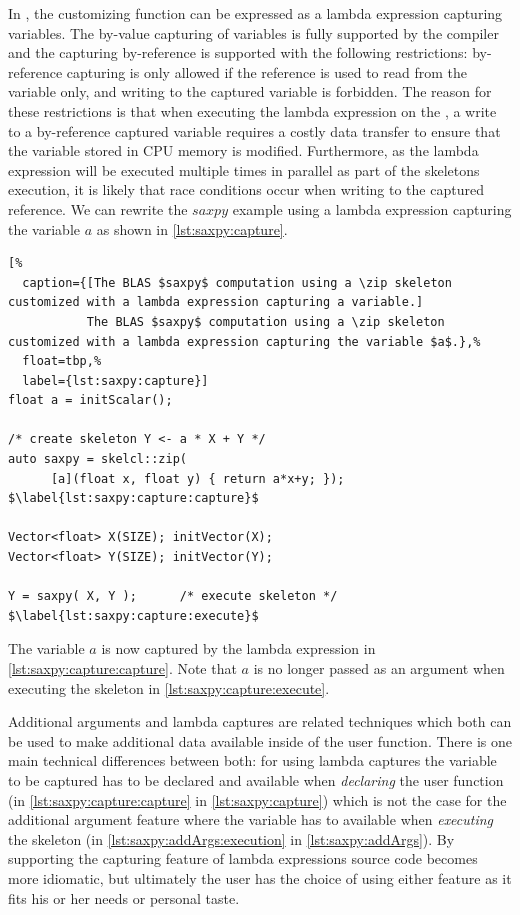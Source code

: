 In \SkelCL, the customizing function can be expressed as a lambda expression capturing variables.
The by-value capturing of variables is fully supported by the  compiler and the capturing by-reference is supported with the following restrictions:
by-reference capturing is only allowed if the reference is used to read from the variable only, and writing to the captured variable is forbidden.
The reason for these restrictions is that when executing the lambda expression on the \GPU, a write to a by-reference captured variable requires a costly data transfer to ensure that the variable stored in CPU memory is modified.
Furthermore, as the lambda expression will be executed multiple times in parallel as part of the skeletons execution, it is likely that race conditions occur when writing to the captured reference.
We can rewrite the $saxpy$ example using a lambda expression capturing the variable $a$ as shown in \autoref{lst:saxpy:capture}.
\begin{lstlisting}[%
  caption={[The BLAS $saxpy$ computation using a \zip skeleton customized with a lambda expression capturing a variable.]
           The BLAS $saxpy$ computation using a \zip skeleton customized with a lambda expression capturing the variable $a$.},%
  float=tbp,%
  label={lst:saxpy:capture}]
float a = initScalar();

/* create skeleton Y <- a * X + Y */
auto saxpy = skelcl::zip(
      [a](float x, float y) { return a*x+y; }); $\label{lst:saxpy:capture:capture}$

Vector<float> X(SIZE); initVector(X);
Vector<float> Y(SIZE); initVector(Y);

Y = saxpy( X, Y );      /* execute skeleton */ $\label{lst:saxpy:capture:execute}$
\end{lstlisting}

The variable $a$ is now captured by the lambda expression in \autoref{lst:saxpy:capture:capture}.
Note that $a$ is no longer passed as an argument when executing the skeleton in \autoref{lst:saxpy:capture:execute}.

\vspace{1em}

Additional arguments and lambda captures are related techniques which both can be used to make additional data available inside of the user function.
There is one main technical differences between both:
for using lambda captures the variable to be captured has to be declared and available when \emph{declaring} the user function (in \autoref{lst:saxpy:capture:capture} in \autoref{lst:saxpy:capture}) which is not the case for the additional argument feature where the variable has to available when \emph{executing} the skeleton (in \autoref{lst:saxpy:addArgs:execution} in \autoref{lst:saxpy:addArgs}).
By supporting the capturing feature of lambda expressions \SkelCL source code becomes more \Cpp idiomatic, but ultimately the user has the choice of using either feature as it fits his or her needs or personal taste.








